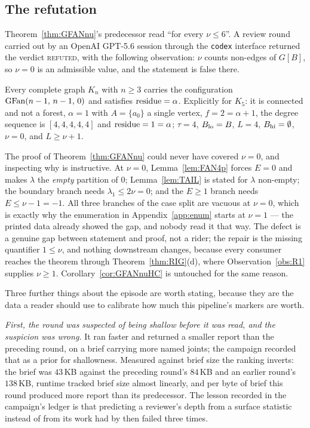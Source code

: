 \subsection{The refutation}\label{sec:refutation}

Theorem~\ref{thm:GFANnu}'s predecessor read ``for every $\nu \le 6$''. A review round
carried out by an OpenAI GPT-5.6 session through the \texttt{codex} interface returned the
verdict \textsc{refuted}, with the following observation: $\nu$ counts non-edges of $G[B]$,
so $\nu = 0$ is an admissible value, and the statement is false there.

\begin{proposition}\label{prop:K5}
Every complete graph $K_n$ with $n \ge 3$ carries the configuration
$\mathrm{GFan}(n-1,\,n-1,\,0)$ and satisfies $\operatorname{residue} = \alpha$. Explicitly for $K_5$: it is connected
and not a forest, $\alpha = 1$ with $A = \{a_0\}$ a single vertex, $f = 2 = \alpha+1$, the
degree sequence is $[4,4,4,4,4]$ and $\operatorname{residue} = 1 = \alpha$; $\tau = 4$, $B_{\mathrm{lo}} = B$, $L = 4$,
$B_{\mathrm{hi}} = \emptyset$, $\nu = 0$, and $L \ge \nu+1$.
\end{proposition}

The proof of Theorem~\ref{thm:GFANnu} could never have covered $\nu = 0$, and inspecting why
is instructive. At $\nu = 0$, Lemma~\ref{lem:FAN4p} forces $E = 0$ and makes $\lambda$ the
\emph{empty} partition of $0$; Lemma~\ref{lem:TAIL} is stated for $\lambda$ non-empty; the
boundary branch needs $\lambda_1 \le 2\nu = 0$; and the $E \ge 1$ branch needs
$E \le \nu-1 = -1$. All three branches of the case split are vacuous at $\nu = 0$, which is
exactly why the enumeration in Appendix~\ref{app:enum} starts at $\nu = 1$ --- the printed
data already showed the gap, and nobody read it that way. The defect is a genuine gap
between statement and proof, not a rider; the repair is the missing quantifier
$1 \le \nu$, and nothing downstream changes, because every consumer reaches the theorem
through Theorem~\ref{thm:RIG}(d), where Observation~\ref{obs:R1} supplies $\nu \ge 1$.
Corollary~\ref{cor:GFANnuHC} is untouched for the same reason.

Three further things about the episode are worth stating, because they are the data a reader
should use to calibrate how much this pipeline's markers are worth.

\emph{First, the round was suspected of being shallow before it was read, and the suspicion
was wrong.} It ran faster and returned a smaller report than the preceding round, on a brief
carrying more named joints; the campaign recorded that as a prior for shallowness. Measured
against brief size the ranking inverts: the brief was $43$\,KB against the preceding round's
$84$\,KB and an earlier round's $138$\,KB, runtime tracked brief size almost linearly, and
per byte of brief this round produced more report than its predecessor. The lesson recorded
in the campaign's ledger is that predicting a reviewer's depth from a surface statistic
instead of from its work had by then failed three times.

